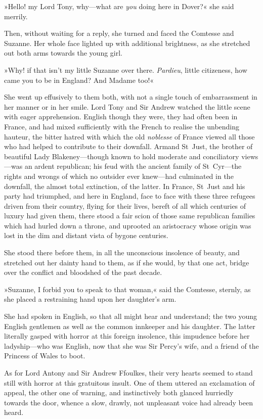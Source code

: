 »Hello! my Lord Tony, why—what are \textit{you} doing here in Dover?« she said merrily.

Then, without waiting for a reply, she turned and faced the Comtesse and Suzanne. Her whole face lighted up with additional brightness, as she stretched out both arms towards the young girl.

»Why! if that isn't my little Suzanne over there. \textit{Pardieu}, little citizeness, how came you to be in England? And Madame too!«

She went up effusively to them both, with not a single touch of embarrassment in her manner or in her smile. Lord Tony and Sir Andrew watched the little scene with eager apprehension. English though they were, they had often been in France, and had mixed sufficiently with the French to realise the unbending hauteur, the bitter hatred with which the old \textit{noblesse} of France viewed all those who had helped to contribute to their downfall. Armand St~Just, the brother of beautiful Lady Blakeney—though known to hold moderate and conciliatory views—was an ardent republican; his feud with the ancient family of St~Cyr—the rights and wrongs of which no outsider ever knew—had culminated in the downfall, the almost total extinction, of the latter. In France, St~Just and his party had triumphed, and here in England, face to face with these three refugees driven from their country, flying for their lives, bereft of all which centuries of luxury had given them, there stood a fair scion of those same republican families which had hurled down a throne, and uprooted an aristocracy whose origin was lost in the dim and distant vista of bygone centuries.

She stood there before them, in all the unconscious insolence of beauty, and stretched out her dainty hand to them, as if she would, by that one act, bridge over the conflict and bloodshed of the past decade.

»Suzanne, I forbid you to speak to that woman,« said the Comtesse, sternly, as she placed a restraining hand upon her daughter's arm.

She had spoken in English, so that all might hear and understand; the two young English gentlemen as well as the common innkeeper and his daughter. The latter literally gasped with horror at this foreign insolence, this impudence before her ladyship—who was English, now that she was Sir Percy's wife, and a friend of the Princess of Wales to boot.

As for Lord Antony and Sir Andrew Ffoulkes, their very hearts seemed to stand still with horror at this gratuitous insult. One of them uttered an exclamation of appeal, the other one of warning, and instinctively both glanced hurriedly towards the door, whence a slow, drawly, not unpleasant voice had already been heard.

